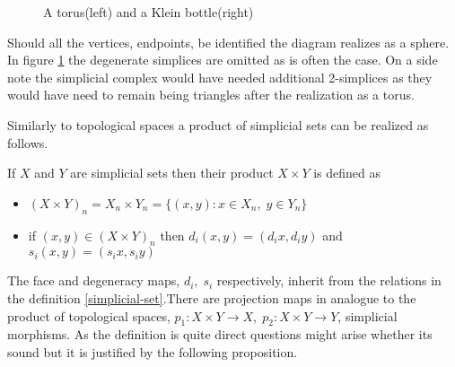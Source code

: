 \documentclass[../../main.tex]{subfiles}
\begin{document}
\begin{example}
\begin{figure}[H]
\begin{subfigure}[b]{0.3\textwidth}
        \end{subfigure}
        \caption{A torus(left) and a Klein bottle(right)}
        \label{fig:squares}
        \end{figure}
        Should all the vertices, endpoints, be identified the diagram realizes as a sphere. In figure \ref{fig:squares} the degenerate simplices are omitted as is often the case. On a side note the simplicial complex would have needed additional 2-simplices as they would have need to remain being triangles after the realization as a torus.
    \end{example}

    Similarly to topological spaces a product of simplicial sets can be realized as follows.

    \begin{definition}
        If $X$ and $Y$ are simplicial sets then their product $X\times Y$ is defined as 
        \begin{itemize}
            \item $(X\times Y)_n= X_n\times Y_n= \{(x,y):x\in X_n,\; y \in Y_n \}$
            \item if $(x,y)\in (X\times Y)_n$ then $d_i(x,y)=(d_ix,d_iy)$ and $s_i(x,y)=(s_ix,s_iy)$
        \end{itemize}
    \end{definition}
    
    The face and degeneracy maps, $d_i,\; s_i$ respectively, inherit from the relations in the definition \ref{simplicial-set}.There are projection maps in analogue to the product of topological spaces, $p_1:X\times Y \to X,\; p_2:X\times Y \to Y$, simplicial morphisms. As the definition is quite direct questions might arise whether its sound but it is justified by the following proposition.
\end{document}
